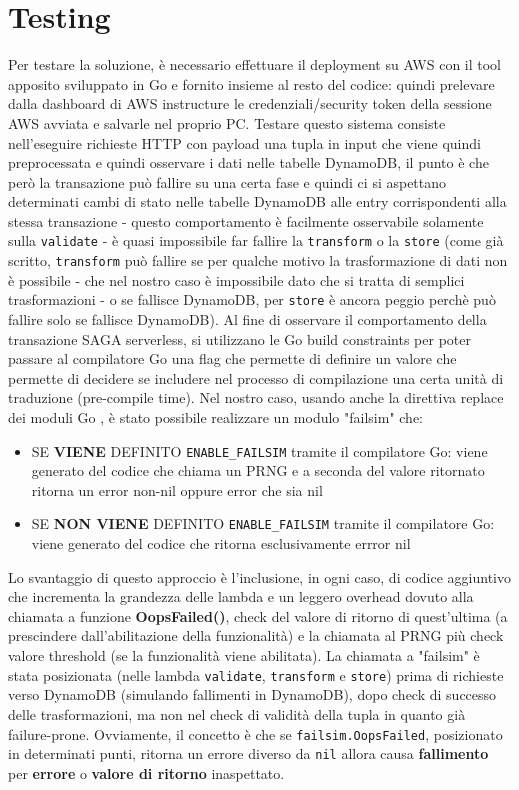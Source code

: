 \documentclass[
    sigconf, 
    screen=false, 
    acmthm=false, 
    nonacm
]{acmart}
\begin{document}
\section{Testing}
Per testare la soluzione, è necessario effettuare il deployment su AWS con il tool apposito sviluppato in Go e 
fornito insieme al resto del codice: quindi prelevare dalla
dashboard di AWS instructure le credenziali/security token della sessione AWS avviata e salvarle nel proprio PC. 
Testare questo sistema consiste nell'eseguire richieste HTTP con payload una tupla in input che viene quindi
preprocessata e quindi osservare i dati nelle tabelle DynamoDB, il punto è che però la transazione può
fallire su una certa fase e quindi ci si aspettano determinati cambi di stato nelle tabelle DynamoDB alle entry
corrispondenti alla stessa transazione - questo comportamento è facilmente osservabile solamente sulla \texttt{validate} -
è quasi impossibile far fallire la \texttt{transform} o la \texttt{store} (come già scritto, \texttt{transform} può fallire se per qualche
motivo la trasformazione di dati non è possibile - che nel nostro caso è impossibile dato che si tratta di semplici 
trasformazioni - o se fallisce DynamoDB, per \texttt{store} è ancora peggio perchè può fallire solo se fallisce DynamoDB).
Al fine di osservare il comportamento della transazione SAGA serverless, si utilizzano le Go build constraints 
\cite{gobuildconstr} per poter passare al compilatore Go una flag che permette di definire un valore che permette
di decidere se includere nel processo di compilazione una certa unità di traduzione (pre-compile time). Nel nostro 
caso, usando anche la direttiva replace dei moduli Go \cite{gomodreplace}, è stato possibile realizzare un modulo
"failsim" che:
\begin{itemize}
    \item SE \textbf{VIENE} DEFINITO \texttt{ENABLE\_FAILSIM} tramite il compilatore Go: viene generato del codice che chiama un PRNG
    e a seconda del valore ritornato ritorna un error non-nil oppure error che sia nil
    \item SE \textbf{NON VIENE} DEFINITO \texttt{ENABLE\_FAILSIM} tramite il compilatore Go: viene generato del codice che ritorna
    esclusivamente errror nil
\end{itemize}
Lo svantaggio di questo approccio è l'inclusione, in ogni caso, di codice aggiuntivo che incrementa la grandezza
delle lambda e un leggero overhead dovuto alla chiamata a funzione \textbf{OopsFailed()}, check del valore di 
ritorno di quest'ultima (a prescindere dall'abilitazione della funzionalità) e la chiamata al PRNG più check valore 
threshold (se la funzionalità viene abilitata). La chiamata a "failsim" è stata posizionata (nelle lambda 
\texttt{validate}, \texttt{transform} e \texttt{store}) prima di richieste verso
DynamoDB (simulando fallimenti in DynamoDB), dopo check di successo delle trasformazioni, ma non nel check di
validità della tupla in quanto già failure-prone. Ovviamente, il concetto è che se \texttt{failsim.OopsFailed}, 
posizionato in determinati punti, ritorna un errore diverso da \texttt{nil} allora causa \textbf{fallimento} per 
\textbf{errore} o \textbf{valore di ritorno} inaspettato.
\end{document}
